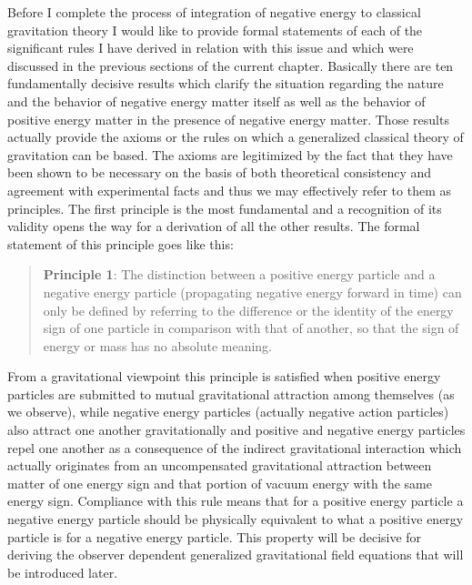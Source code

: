 \documentclass[notitlepage,12pt]{report}
\begin{document}
Before I complete the process of integration of negative energy to classical gravitation theory I would like to provide formal statements of each of the significant rules I have derived in relation with this issue and which were discussed in the previous sections of the current chapter. Basically there are ten fundamentally decisive results which clarify the situation regarding the nature and the behavior of negative energy matter itself as well as the behavior of positive energy matter in the presence of negative energy matter. Those results actually provide the axioms or the rules on which a generalized classical theory of gravitation can be based. The axioms are legitimized by the fact that they have been shown to be necessary on the basis of both theoretical consistency and agreement with experimental facts and thus we may effectively refer to them as principles. The first principle is the most fundamental and a recognition of its validity opens the way for a derivation of all the other results. The formal statement of this principle goes like this:
\begin{quote}
\textbf{Principle 1}: The distinction between a positive energy particle and a negative energy particle (propagating negative energy forward in time) can only be defined by referring to the difference or the identity of the energy sign of one particle in comparison with that of another, so that the sign of energy or mass has no absolute meaning.
\end{quote}
From a gravitational viewpoint this principle is satisfied when positive energy particles are submitted to mutual gravitational attraction among themselves (as we observe), while negative energy particles (actually negative action particles) also attract one another gravitationally and positive and negative energy particles repel one another as a consequence of the indirect gravitational interaction which actually originates from an uncompensated gravitational attraction between matter of one energy sign and that portion of vacuum energy with the same energy sign. Compliance with this rule means that for a positive energy particle a negative energy particle should be physically equivalent to what a positive energy particle is for a negative energy particle. This property will be decisive for deriving the observer dependent generalized gravitational field equations that will be introduced later.
\end{document}
